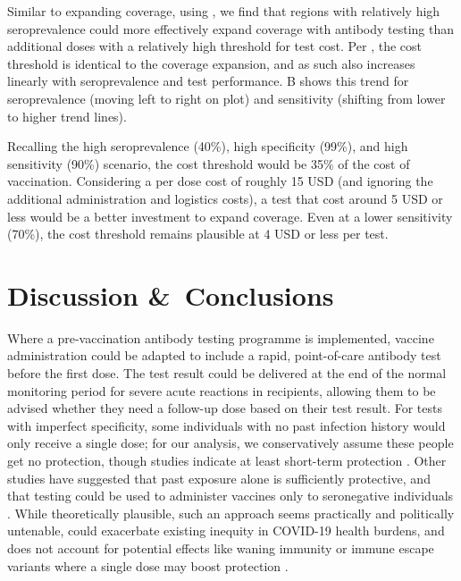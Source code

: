 \documentclass[10pt,a4paper,twocolumn]{article}
\begin{document}
Similar to expanding coverage, using , we find that regions with relatively high seroprevalence could more effectively expand coverage with antibody testing than additional doses with a relatively high threshold for test cost. Per , the cost threshold is identical to the coverage expansion, and as such also increases linearly with seroprevalence and test performance. B shows this trend for seroprevalence (moving left to right on plot) and sensitivity (shifting from lower to higher trend lines).

Recalling the high seroprevalence (40\%), high specificity (99\%), and high sensitivity (90\%) scenario, the cost threshold would be 35\% of the cost of vaccination. Considering a per dose cost of roughly 15 USD (and ignoring the additional administration and logistics costs), a test that cost around 5 USD or less would be a better investment to expand coverage. Even at a lower sensitivity (70\%), the cost threshold remains plausible at 4 USD or less per test.

\section*{Discussion \&\ Conclusions}

Where a pre-vaccination antibody testing programme is implemented, vaccine administration could be adapted to include a rapid, point-of-care antibody test before the first dose. The test result could be delivered at the end of the normal monitoring period for severe acute reactions in recipients, allowing them to be advised whether they need a follow-up dose based on their test result. For tests with imperfect specificity, some individuals with no past infection history would only receive a single dose; for our analysis, we conservatively assume these people get no protection, though studies indicate at least short-term protection \cite{krammer_antibody_2021}. Other studies have suggested that past exposure alone is sufficiently protective, and that testing could be used to administer vaccines only to seronegative individuals \cite{bubar_model-informed_2021}. While theoretically plausible, such an approach seems practically and politically untenable, could exacerbate existing inequity in COVID-19 health burdens, and does not account for potential effects like waning immunity or immune escape variants where a single dose may boost protection \cite{stamatatos_mrna_2021, lustig_neutralizing_2021}.
\end{document}
